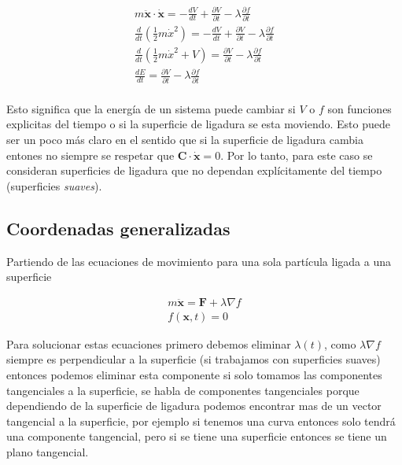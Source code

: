 \begin{enumerate}
            \begin{gather*}
                m\ddot{\mathbf{x}}\cdot \dot{\mathbf{x}} = -\frac{dV}{dt} + \frac{\partial V}{\partial t} - \lambda\frac{\partial f}{\partial t}\\
                \frac{d}{dt}\left(\frac{1}{2}m\dot{x}^2\right) = -\frac{dV}{dt} + \frac{\partial V}{\partial t} - \lambda\frac{\partial f}{\partial t}\\
                \frac{d}{dt}\left(\frac{1}{2}m\dot{x}^2 + V \right) =    \frac{\partial V}{\partial t} - \lambda\frac{\partial f}{\partial t}\\
                \frac{dE}{dt} =    \frac{\partial V}{\partial t} - \lambda\frac{\partial f}{\partial t}\\
            \end{gather*}

            Esto significa que la energía de un sistema puede cambiar si $V$ o $f$ son funciones explicitas del tiempo o si la superficie de ligadura se esta moviendo. Esto puede ser un poco más claro en el sentido que si la superficie de ligadura cambia entones no siempre se respetar que $\mathbf{C}\cdot \mathbf{\dot{x}} = 0$. Por lo tanto, para este caso se consideran superficies de ligadura que no dependan explícitamente del tiempo (superficies \textit{suaves}).
    \end{enumerate}

\subsection[short]{Coordenadas generalizadas}

    Partiendo de las ecuaciones de movimiento para una sola partícula ligada a una superficie

    \begin{gather*}
        m\ddot{\mathbf{x}} = \mathbf{F} + \lambda \nabla f\\
        f(\mathbf{x},t) = 0
    \end{gather*}

    Para solucionar estas ecuaciones primero debemos eliminar $\lambda(t)$, como  $\lambda \nabla f$ siempre es perpendicular a la superficie (si trabajamos con superficies suaves) entonces podemos eliminar esta componente si solo tomamos las componentes tangenciales a la superficie, se habla de componentes tangenciales porque dependiendo de la superficie de ligadura podemos encontrar mas de un vector tangencial a la superficie, por ejemplo si tenemos una curva entonces solo tendrá una componente tangencial, pero si se tiene una superficie entonces se tiene un plano tangencial.

